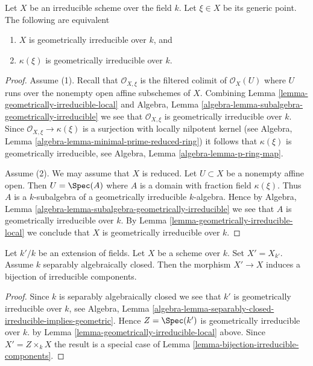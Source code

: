 \begin{lemma}
\label{lemma-geometrically-irreducible-function-field}
Let $X$ be an irreducible scheme over the field $k$. Let $\xi \in X$
be its generic point. The following are equivalent
\begin{enumerate}
\item $X$ is geometrically irreducible over $k$, and
\item $\kappa(\xi)$ is geometrically irreducible over $k$.
\end{enumerate}
\end{lemma}

\begin{proof}
Assume (1). Recall that $\mathcal{O}_{X, \xi}$ is the filtered
colimit of $\mathcal{O}_X(U)$ where $U$ runs over the nonempty
open affine subschemes of $X$. Combining
Lemma \ref{lemma-geometrically-irreducible-local}
and
Algebra, Lemma \ref{algebra-lemma-subalgebra-geometrically-irreducible}
we see that $\mathcal{O}_{X, \xi}$ is geometrically irreducible over $k$.
Since $\mathcal{O}_{X, \xi} \to \kappa(\xi)$ is a surjection with
locally nilpotent kernel (see
Algebra, Lemma \ref{algebra-lemma-minimal-prime-reduced-ring})
it follows that $\kappa(\xi)$ is geometrically irreducible, see
Algebra, Lemma \ref{algebra-lemma-p-ring-map}.

\medskip\noindent
Assume (2). We may assume that $X$ is reduced. Let $U \subset X$ be
a nonempty affine open. Then $U = \Spec(A)$ where $A$ is a domain
with fraction field $\kappa(\xi)$. Thus $A$ is a $k$-subalgebra
of a geometrically irreducible $k$-algebra. Hence by
Algebra, Lemma \ref{algebra-lemma-subalgebra-geometrically-irreducible}
we see that $A$ is geometrically irreducible over $k$.
By Lemma \ref{lemma-geometrically-irreducible-local} we conclude
that $X$ is geometrically irreducible over $k$.
\end{proof}

\begin{lemma}
\label{lemma-separably-closed-field-irreducible-components}
Let $k'/k$ be an extension of fields.
Let $X$ be a scheme over $k$. Set $X' = X_{k'}$.
Assume $k$ separably algebraically closed.
Then the morphism $X' \to X$ induces a bijection of irreducible components.
\end{lemma}

\begin{proof}
Since $k$ is separably algebraically closed we see that
$k'$ is geometrically irreducible over $k$, see Algebra,
Lemma \ref{algebra-lemma-separably-closed-irreducible-implies-geometric}.
Hence $Z = \Spec(k')$ is geometrically irreducible over $k$.
by Lemma \ref{lemma-geometrically-irreducible-local} above.
Since $X' = Z \times_k X$ the result is a special case
of Lemma \ref{lemma-bijection-irreducible-components}.
\end{proof}

